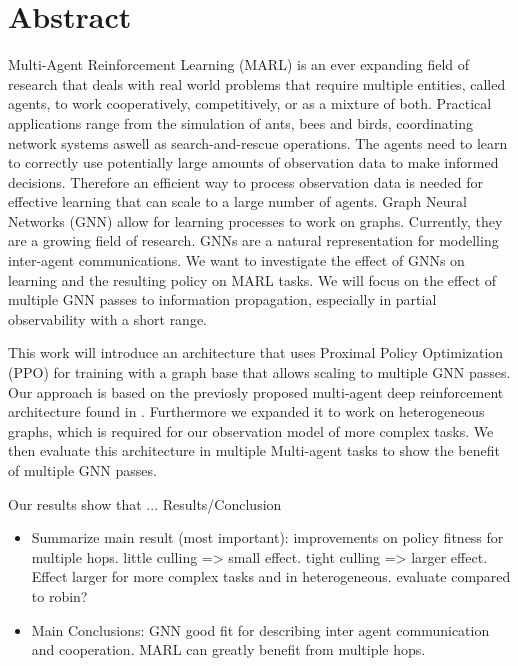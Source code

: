 
\chapter*{Abstract}

Multi-Agent Reinforcement Learning (MARL) is an ever expanding field of research that deals with real world problems that require multiple entities, called agents, to work cooperatively, competitively, or as a mixture of both. Practical applications range from the simulation of ants, bees and birds, coordinating network systems aswell as search-and-rescue operations. The agents need to learn to correctly use potentially large amounts of observation data to make informed decisions. Therefore an efficient way to process observation data is needed for effective learning that can scale to a large number of agents. Graph Neural Networks (GNN) allow for learning processes to work on graphs. Currently, they are a growing field of research. GNNs are a natural representation for modelling inter-agent communications. We want to investigate the effect of GNNs on learning and the resulting policy on MARL tasks. We will focus on the effect of multiple GNN passes to information propagation, especially in partial observability with a short range.\par

This work will introduce an architecture that uses Proximal Policy Optimization (PPO) for training with a graph base that allows scaling to multiple GNN passes. Our approach is based on the previosly proposed multi-agent deep reinforcement architecture found in \citet{RobinRuede2021}. Furthermore we expanded it to work on heterogeneous graphs, which is required for our observation model of more complex tasks. We then evaluate this architecture in multiple Multi-agent tasks to show the benefit of multiple GNN passes. 
\par

Our results show that ... %
Results/Conclusion
\begin{itemize}[noitemsep,nolistsep]
    \item Summarize main result (most important): improvements on policy fitness for multiple hops. little culling => small effect. tight culling => larger effect. Effect larger for more complex tasks and in heterogeneous. evaluate compared to robin?
    \item Main Conclusions: GNN good fit for describing inter agent communication and cooperation. MARL can greatly benefit from multiple hops.
\end{itemize}

